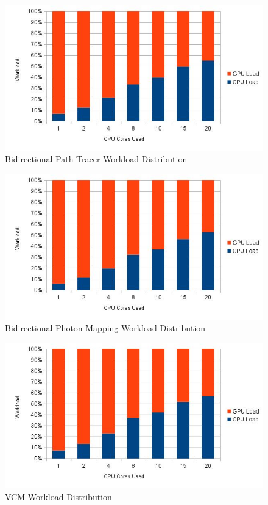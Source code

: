 \begin{figure}[H]
\centering
\includegraphics[width=0.8\linewidth]{img/bptwl.jpg}
\caption{\label{img:bptwl} Bidirectional Path Tracer Workload Distribution}
\end{figure}

\begin{figure}[H]
\centering
\includegraphics[width=0.8\linewidth]{img/bpmwl.jpg}
\caption{\label{img:bpmwl} Bidirectional Photon Mapping Workload Distribution}
\end{figure}

\begin{figure}[H]
\centering
\includegraphics[width=0.8\linewidth]{img/vcmwl.jpg}
\caption{\label{img:vcmwl} VCM Workload Distribution}
\end{figure}

